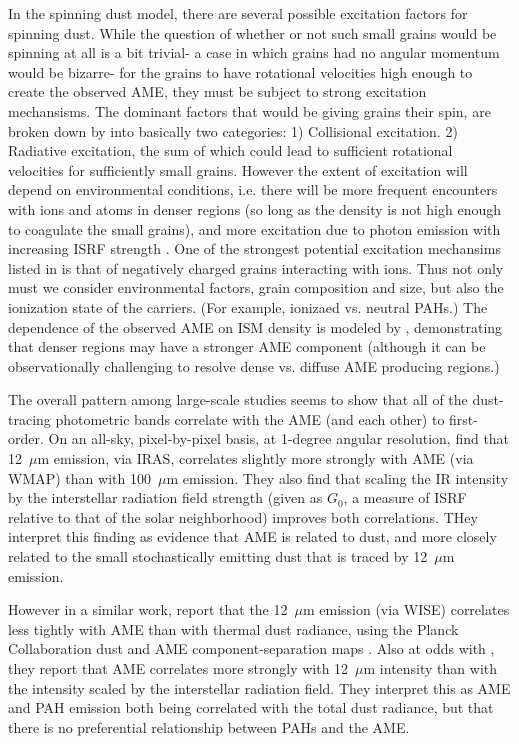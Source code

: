 \documentclass[preprint2,longabstract]{aastex}
\begin{document}
     In the spinning dust model, there are several possible excitation factors for spinning dust. While the question of whether or not such small grains would be spinning at all is a bit trivial- a case in which grains had no angular momentum would be bizarre- for the grains to have rotational velocities high enough to create the observed AME, they must be subject to strong excitation mechansisms. The dominant factors that would be giving grains their spin, are broken down by \cite{draine11} into basically two categories: 1) Collisional excitation. 2) Radiative excitation, the sum of which could lead to sufficient rotational velocities for sufficiently small grains. However the extent of excitation will depend on environmental conditions, i.e. there will be more frequent encounters with ions and atoms in denser regions (so long as the density is not high enough to coagulate the small grains), and more excitation due to photon emission with increasing ISRF strength \citep{ali-haimoud09, ali-haimoud13}. One of the strongest potential excitation mechansims listed in \cite{draine11} is that of negatively charged grains interacting with ions. Thus not only must we consider environmental factors, grain composition and size, but also the ionization state of the carriers. (For example, ionizaed vs. neutral PAHs.) The dependence of the observed AME on ISM density is modeled by \cite{ali-haimoud10}, demonstrating that denser regions may have a stronger AME component (although it can be observationally challenging to resolve dense vs. diffuse AME producing regions.)

    The overall pattern among large-scale studies seems to show that all of the dust-tracing photometric bands correlate with the AME (and each other) to first-order.  On an all-sky, pixel-by-pixel basis, at 1-degree angular resolution, \cite{ysard10b} find that 12~$\mu$m emission, via IRAS, correlates slightly more strongly with AME (via WMAP) than with 100~$\mu$m emission.  They also find that scaling the IR intensity by the interstellar radiation field strength (given as $G_0$, a measure of ISRF relative to that of the solar neighborhood) improves both correlations. THey interpret this finding as evidence that AME is related to dust, and more closely related to the small stochastically emitting dust that is traced by 12~$\mu$m emission.

    However in a similar work, \cite{hensley16} report that the 12~$\mu$m emission (via WISE) correlates less tightly with AME than with thermal dust radiance, using the Planck Collaboration dust and AME component-separation maps \citep{planck15X}. Also at odds with \cite{ysard10b}, they report that AME correlates more strongly with 12~$\mu$m intensity than with the intensity scaled by the interstellar radiation field. They interpret this as AME and PAH emission both being correlated with the total dust radiance, but that there is no preferential relationship between PAHs and the AME.
\end{document}
